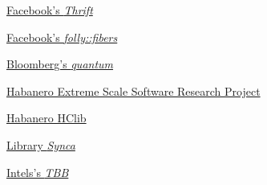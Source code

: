 \begin{thebibliography}{99}
        \href{https://github.com/facebook/fbthrift}
        {Facebook's \emph{Thrift}}

        \href{https://github.com/facebook/folly/tree/master/folly/fibers}
        {Facebook's \emph{folly::fibers}}

        \href{https://github.com/bloomberg/quantum}
        {Bloomberg's \emph{quantum}}

    \href{https://wiki.rice.edu/confluence/display/HABANERO/Habanero+Extreme+Scale+Software+Research+Project}
        {Habanero Extreme Scale Software Research Project}

    \href{https://github.com/habanero-rice/hclib}
        {Habanero HClib}

        \href{https://github.com/gridem/Synca}
        {Library \emph{Synca}}

        \href{https://github.com/intel/tbb}
        {Intels's \emph{TBB}}

\end{thebibliography}
